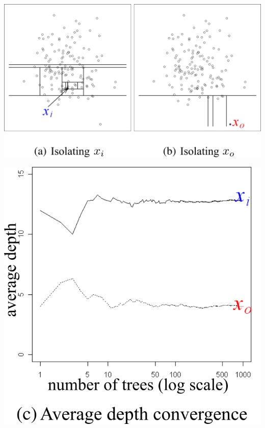 \begin{minipage}{0.52\linewidth}
\centering
\includegraphics[scale=.95]{fig_source/ideeIF}
\label{fig:ideeIF}
\end{minipage}\hfill
\begin{minipage}{0.52\linewidth}
\centering
\includegraphics[scale=.95]{fig_source/convergenceIF}
\label{2Dcones}
\end{minipage}


